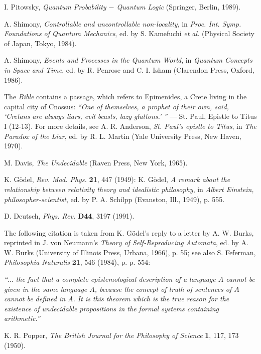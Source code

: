 \begin{thebibliography}{99}
 I. Pitowsky, {\sl Quantum Probability $-$ Quantum Logic} (Springer,
 Berlin, 1989).


 A. Shimony, {\sl Controllable and uncontrollable non-locality}, in
 {\sl Proc. Int. Symp. Foundations of Quantum Mechanics}, ed. by S.
 Kamefuchi {\it et al.} (Physical Society of Japan, Tokyo, 1984).

 A. Shimony, {\sl Events and Processes in the Quantum World}, in {\sl
 Quantum Concepts in Space and Time}, ed. by R. Penrose and C. I. Isham
 (Clarendon Press, Oxford, 1986).

 The {\sl Bible} contains a passage, which
 refers to Epimenides, a Crete living in the capital city of
 Cnossus:
 {\it ``One of themselves, a prophet of their own, said, `Cretans are
 always liars, evil beasts, lazy gluttons.'  ''} --- St. Paul,
 Epistle to Titus I (12-13).
 For more details, see
 A. R. Anderson, {\sl St. Paul's epistle to Titus}, in {\sl The Paradox
 of the Liar}, ed. by R. L. Martin (Yale University Press, New Haven,
 1970).


 M. Davis, {\sl The Undecidable} (Raven Press, New York, 1965).

K. G\"odel, {\sl Rev. Mod. Phys.} {\bf 21}, 447 (1949):
K. G\"odel, {\sl A remark about the relationship between relativity
theory and idealistic philosophy}, in
{\sl Albert Einstein, philosopher-scientist}, ed. by P. A. Schilpp
(Evanston, Ill., 1949),
p. 555.

D. Deutsch, {\sl Phys. Rev.} {\bf D44}, 3197 (1991).

The following citation is taken from K. G\"odel's reply to a letter by
A. W.
 Burks, reprinted in J. von Neumann's
 {\sl Theory of Self-Reproducing Automata}, ed. by A. W. Burks
 (University of Illinois Press, Urbana, 1966),
 p. 55; see also
  S. Feferman, {\sl Philosophia Naturalis} {\bf 21}, 546 (1984), p.
 p. 554:

 {\em
 ``$\ldots$
  the fact that a complete epistemological description
 of a language $A$ cannot be given in the same language $A$, because
 the concept of truth of sentences of $A$ cannot be defined in $A$. It
 is this theorem which is the true reason for the existence of
 undecidable propositions in the formal systems containing
arithmetic.''}


 K. R. Popper, {\sl The British Journal for the Philosophy of Science}
 {\bf 1}, 117, 173 (1950).


\end{thebibliography}
